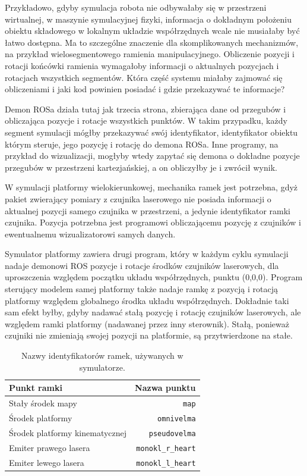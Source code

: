 			Przykładowo, gdyby symulacja robota nie odbywałaby się w przestrzeni wirtualnej, w maszynie symulacyjnej fizyki, 
			informacja o dokładnym położeniu obiektu składowego w lokalnym układzie współrzędnych wcale nie musiałaby być łatwo dostępna.
			Ma to szczególne znaczenie dla skomplikowanych mechanizmów, na przykład wielosegmentowego ramienia manipulacyjnego.
			Obliczenie pozycji i rotacji końcówki ramienia wymagałoby informacji o aktualnych pozycjach i rotacjach wszystkich segmentów.
			Która część systemu miałaby zajmować się obliczeniami i jaki kod powinien posiadać i gdzie przekazywać te informacje?
			
			Demon ROSa działa tutaj jak trzecia strona, zbierająca dane od przegubów i obliczająca pozycje i rotacje wszystkich punktów.
			W takim przypadku, każdy segment symulacji mógłby przekazywać swój identyfikator, identyfikator obiektu którym steruje, jego pozycję i rotację do demona ROSa.
			Inne programy, na przykład do wizualizacji, mogłyby wtedy zapytać się demona o dokładne pozycje przegubów w przestrzeni kartezjańskiej, a on obliczyłby je i zwrócił wynik.
			
			W symulacji platformy wielokierunkowej, mechanika ramek jest potrzebna, gdyż pakiet zwierający pomiary z czujnika laserowego nie posiada informacji o aktualnej
			pozycji samego czujnika w przestrzeni, a jedynie identyfikator ramki czujnika. 
			Pozycja potrzebna jest programowi obliczającemu pozycję z czujników i ewentualnemu wizualizatorowi samych danych.
			
			Symulator platformy zawiera drugi program, który w każdym cyklu symulacji nadaje demonowi ROS pozycje i rotacje środków czujników laserowych, dla uproszczenia
			względem początku układu współrzędnych, punktu (0,0,0). 
			Program sterujący modelem samej platformy także nadaje ramkę z pozycją i rotacją platformy względem globalnego środka układu współrzędnych.
			Dokładnie taki sam efekt byłby, gdyby nadawać stałą pozycję i rotację czujników laserowych, ale względem ramki platformy (nadawanej przez inny sterownik).
			Stałą, ponieważ czujniki nie zmieniają swojej pozycji na platformie, są przytwierdzone na stałe.
			
			\begin{table}
				\centering
				\begin{tabular}{l r}
					Punkt ramki & Nazwa punktu \\
					\hline
					Stały środek mapy & \texttt{map} \\
					Środek platformy & \texttt{omnivelma} \\
					Środek platformy kinematycznej & \texttt{pseudovelma} \\
					Emiter prawego lasera & \texttt{monokl\_r\_heart} \\
					Emiter lewego lasera & \texttt{monokl\_l\_heart} \\
				\end{tabular}
				\caption{Nazwy identyfikatorów ramek, używanych w symulatorze.}
				\label{tab:frames}
			\end{table}
				
